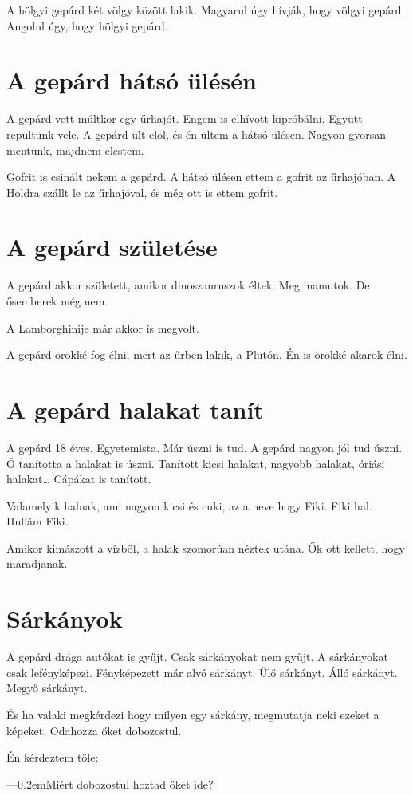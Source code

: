 \documentclass[12pt]{memoir}
\def\dash{---\kern 0.2em}
\begin{document}
A hölgyi gepárd két völgy között lakik. Magyarul úgy hívják, hogy völgyi
gepárd. Angolul úgy, hogy hölgyi gepárd.


\section{A gepárd hátsó ülésén}
A gepárd vett múltkor egy űrhajót. Engem is elhívott kipróbálni. Együtt
repültünk vele. A gepárd ült elöl, és én ültem a hátsó ülésen. Nagyon gyorsan
mentünk, majdnem elestem.

Gofrit is csinált nekem a gepárd. A hátsó ülésen ettem a gofrit az űrhajóban. A
Holdra szállt le az űrhajóval, és még ott is ettem gofrit.

 
\section{A gepárd születése}
A gepárd akkor született, amikor dinoszauruszok éltek. Meg mamutok. De
ősemberek még nem.

A Lamborghinije már akkor is megvolt.

A gepárd örökké fog élni, mert az űrben lakik, a Plutón. Én is örökké akarok
élni.


\section{A gepárd halakat tanít}
A gepárd 18 éves. Egyetemista. Már úszni is tud. A gepárd nagyon jól tud úszni.
Ő tanította a halakat is úszni. Tanított kicsi halakat, nagyobb halakat, óriási
halakat… Cápákat is tanított.

Valamelyik halnak, ami nagyon kicsi és cuki, az a neve hogy Fiki. Fiki hal.
Hullám Fiki.

Amikor kimászott a vízből, a halak szomorúan néztek utána. Ők ott kellett, hogy
maradjanak.


\section{Sárkányok}
A gepárd drága autókat is gyűjt. Csak sárkányokat nem gyűjt. A sárkányokat csak
lefényképezi. Fényképezett már alvó sárkányt. Ülő sárkányt. Álló sárkányt.
Megyő sárkányt.

És ha valaki megkérdezi hogy milyen egy sárkány, megmutatja neki ezeket a
képeket. Odahozza őket dobozostul.

Én kérdeztem tőle:

\dash Miért dobozostul hoztad őket ide?
\end{document}
